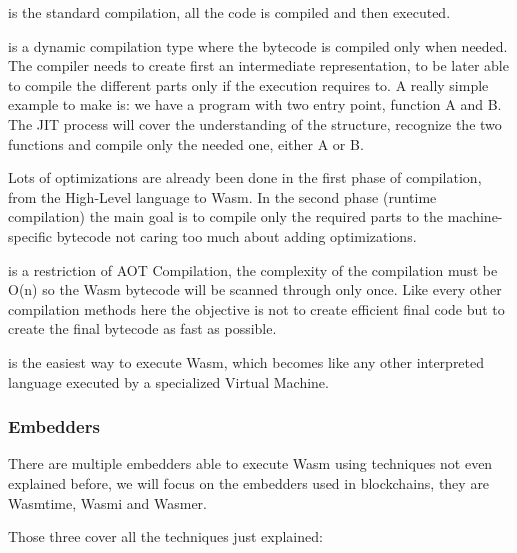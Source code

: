 \documentclass[../main.tex]{subfiles}
\begin{document}
\begin{description}[font=$\bullet$ \scshape\bfseries]
  \item[AOT]
        is the standard compilation, all the code is compiled and then executed.
  \item[JIT]
        is a dynamic compilation type where the bytecode is compiled only when needed. The compiler needs to create first an intermediate representation, to be later able to compile the different parts only if the execution requires to. A really simple example to make is: we have a program with two entry point, function A and B. The JIT process will cover the understanding of the structure, recognize the two functions and compile only the needed one, either A or B.

        Lots of optimizations are already been done in the first phase of compilation, from the High-Level language to Wasm. In the second phase (runtime compilation) the main goal is to compile only the required parts to the machine-specific bytecode not caring too much about adding optimizations.
  \item[SPC]
        is a restriction of AOT Compilation, the complexity of the compilation must be O(n) so the Wasm bytecode will be scanned through only once. Like every other compilation methods here the objective is not to create efficient final code but to create the final bytecode as fast as possible.
  \item[Interpretation] %
        is the easiest way to execute Wasm, which becomes like any other interpreted language executed by a specialized Virtual Machine.

\end{description}

\subsubsection{Embedders}

There are multiple embedders able to execute Wasm using techniques not even explained before, we will focus on the embedders used in blockchains, they are Wasmtime, Wasmi and Wasmer.

Those three cover all the techniques just explained:
\end{document}
